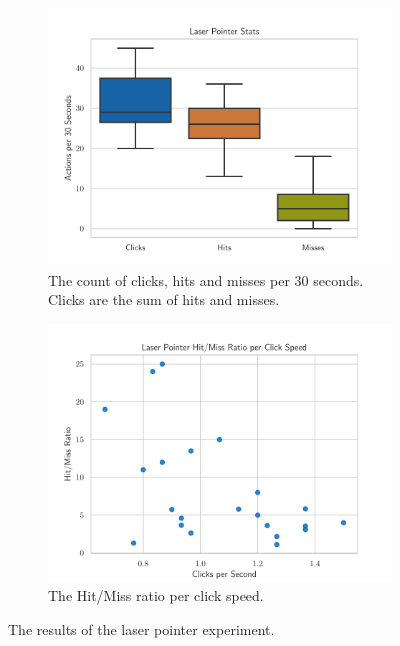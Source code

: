 \begin{figure}[H]
  \centering
  \begin{subfigure}{.48\linewidth}%
    \centering
    \includegraphics[width=\linewidth]{figures/evaluation/eval_exp_lp.pdf}
    \caption{The count of clicks, hits and misses per 30 seconds. Clicks are the sum of hits and misses.}\label{fig:eval-exp-lp}
  \end{subfigure}%
  \hspace{0.02\linewidth}%
  \begin{subfigure}{.48\linewidth}%
    \centering
    \includegraphics[width=\linewidth]{figures/evaluation/eval_exp_lp_ratio_scatter.pdf}
    \caption{The Hit/Miss ratio per click speed.}\label{fig:eval-exp-lp-ratio-scatter} %
  \end{subfigure}%
  \caption[Laser pointer experiment results]{The results of the laser pointer experiment.}\label{fig:exp-lp-eval}
\end{figure}

